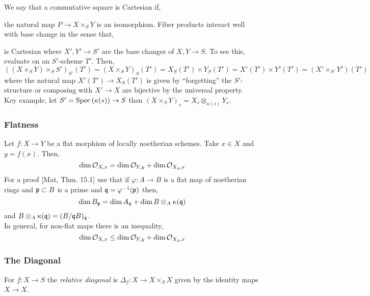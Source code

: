\documentclass[12pt]{article}
\begin{document}
We say that a commutative square is Cartesian if,
\begin{center}
\end{center}
the natural map $P \to X \times_S Y$ is an isomorphism. Fiber products interact well with base change in the sense that,
\begin{center}
\end{center}
is Cartesian where $X', Y' \to S'$ are the base changes of $X,Y \to S$. To see this, evaluate on an $S'$-scheme $T'$. Then,
\[ ((X \times_S Y) \times_S S')_{S'}(T') = (X \times_S Y)_S(T') = X_S(T') \times Y_S(T') = X'(T') \times Y'(T') = (X' \times_{S'} Y')(T') \]
where the natural map $X'(T') \to X_S(T')$ is given by ``forgetting'' the $S'$-structure or composing with $X' \to X$ are bijective by the universal property.
\bigskip\\
Key example, let $S' = \mathrm{Spec}\left( \kappa(s) \right) \to S$ then $(X \times_S Y)_s = X_s \otimes_{\kappa(s)} Y_s$. 

\subsubsection{Flatness}

Let $f : X \to Y$ be a flat morphism of locally noetherian schemes. Take $x \in X$ and $y = f(x)$. Then,
\[ \dim \mathcal{O}_{X, x} = \dim{\mathcal{O}_{Y, y}} + \dim{\mathcal{O}_{X_y, x}} \]
For a proof [Mat, Thm. 15.1] use that if $\varphi : A \to B$ is a flat map of noetherian rings and $\mathfrak{p} \subset B$ is a prime and $\mathfrak{q} = \varphi^{-1}(\mathfrak{p})$ then,
\[ \dim{B_{\mathfrak{p}}} = \dim{A_{\mathfrak{q}}} + \dim{B \otimes_A \kappa(\mathfrak{q})} \]
and $B \otimes_A \kappa(\mathfrak{q}) = (B / \mathfrak{q} B)_{\mathfrak{q}}$.
\bigskip\\
In general, for non-flat maps there is an inequality,
\[ \dim{\mathcal{O}_{X, x}} \le \dim{\mathcal{O}_{Y, y}} + \dim{\mathcal{O}_{X_y, x}} \] 

\subsubsection{The Diagonal}

\begin{defn}
For $f : X \to S$ the \textit{relative diagonal} is $\Delta_f : X \to X \times_S X$ given by the identity maps $X \to X$.
\end{defn}
\end{document}
